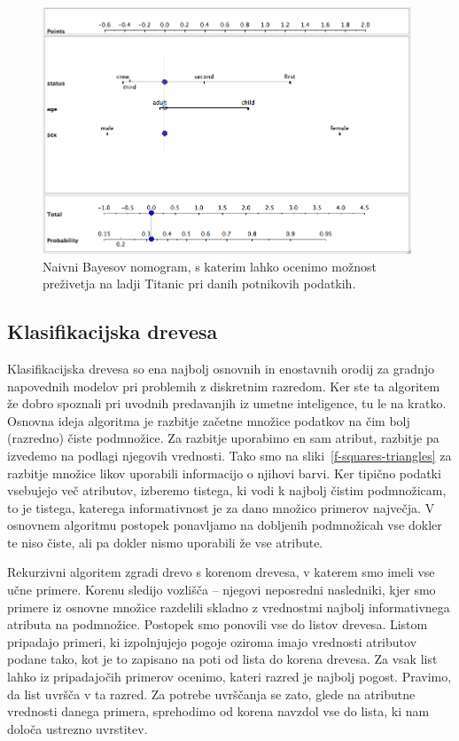\begin{figure}[htbp]
\begin{center}
\includegraphics[width=11cm]{slike/nbc-titanic.png}
\caption{Naivni Bayesov nomogram, s katerim lahko ocenimo možnost preživetja na ladji Titanic pri danih potnikovih podatkih.}
\label{f-nomogram}
\end{center}
\end{figure}

\subsection{Klasifikacijska drevesa}

Klasifikacijska drevesa so ena najbolj osnovnih in enostavnih orodij za gradnjo napovednih modelov pri problemih z diskretnim razredom. Ker ste ta algoritem že dobro spoznali pri uvodnih predavanjih iz umetne inteligence, tu le na kratko. Osnovna ideja algoritma je razbitje začetne množice podatkov na čim bolj (razredno) čiste podmnožice. Za razbitje uporabimo en sam atribut, razbitje pa izvedemo na podlagi njegovih vrednosti. Tako smo na sliki~\ref{f-squares-triangles} za razbitje množice likov uporabili informacijo o njihovi barvi. Ker tipično podatki vsebujejo več atributov, izberemo tistega, ki vodi k najbolj čistim podmnožicam, to je tistega, katerega informativnost je za dano množico primerov največja. V osnovnem algoritmu postopek ponavljamo na dobljenih podmnožicah vse dokler te niso čiste, ali pa dokler nismo uporabili že vse atribute.

Rekurzivni algoritem zgradi drevo s korenom drevesa, v katerem smo imeli vse učne primere. Korenu sledijo vozlišča -- njegovi neposredni nasledniki, kjer smo primere iz osnovne množice razdelili skladno z vrednostmi najbolj informativnega atributa na podmnožice. Postopek smo ponovili vse do listov drevesa. Listom pripadajo primeri, ki izpolnjujejo pogoje oziroma imajo vrednosti atributov podane tako, kot je to zapisano na poti od lista do korena drevesa. Za vsak list lahko iz pripadajočih primerov ocenimo, kateri razred je najbolj pogost. Pravimo, da list uvršča v ta razred. Za potrebe uvrščanja se zato, glede na atributne vrednosti danega primera, sprehodimo od korena navzdol vse do lista, ki nam določa ustrezno uvrstitev.


